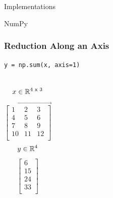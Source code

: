 \documentclass{beamer}
\theoremstyle{case}
\begin{document}
\begin{section}{Implementations}
\begin{subsection}{NumPy}
\begin{frame}
    \frametitle{Reduction Along an Axis}
    \begin{center}
        \texttt{y = np.sum(x, axis=1)}
    \end{center}
    \begin{columns}
            $$ x \in \mathbb{R}^{4 \text{ x } 3} $$
            \[
            \overrightarrow{
            \begin{bmatrix}
            1 & 2 & 3 \\
            4 & 5 & 6 \\
            7 & 8 & 9 \\
            10 & 11 & 12 \\
            \end{bmatrix}
            }\]
            $$ y \in \mathbb{R}^4 $$
            \[
            \begin{bmatrix}
            6 \\
            15 \\
            24 \\
            33 \\
            \end{bmatrix}
            \]
    \end{columns}
\end{frame}


\end{subsection}
\end{section}
\end{document}
